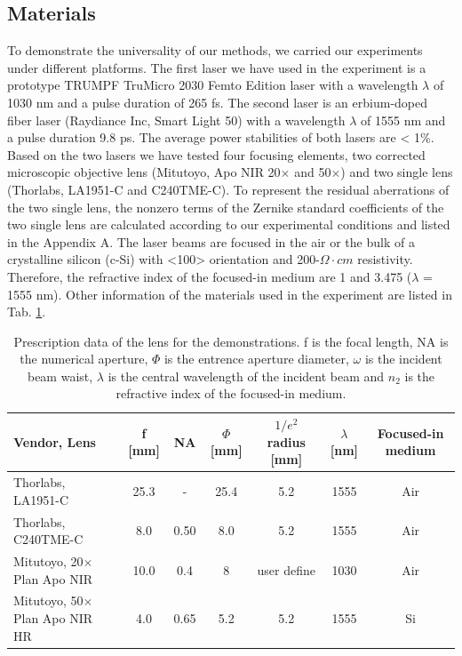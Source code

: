 \documentclass[9pt,twocolumn,twoside]{osajnl}
\begin{document}
\subsection{Materials}
To demonstrate the universality of our methods, we carried our experiments under different platforms. The first laser we have used in the experiment is a prototype TRUMPF TruMicro 2030 Femto Edition laser with a wavelength $\lambda$ of 1030 nm and a pulse duration of 265 fs. The second laser is an erbium-doped fiber laser (Raydiance Inc, Smart Light 50) with a wavelength $\lambda$ of 1555 nm and a pulse duration 9.8 ps. The average power stabilities of both lasers are < 1\%. Based on the two lasers we have tested four focusing elements, two corrected microscopic objective lens (Mitutoyo, Apo NIR 20$\times$ and 50$\times$) and two single lens (Thorlabs, LA1951-C and C240TME-C). To represent the residual aberrations of the two single lens, the nonzero terms of the Zernike standard coefficients of the two single lens are calculated according to our experimental conditions and listed in the Appendix A. The laser beams are focused in the air or the bulk of a crystalline silicon (c-Si) with <100> orientation and 200-$\Omega\cdot cm$ resistivity. Therefore, the refractive index of the focused-in medium are 1 and 3.475 ($\lambda$ = 1555 nm). Other information of the materials used in the experiment are listed in Tab. \ref{tab:1}.
\begin{table}
	\centering
	\begin{tabular}[c]{|l|c|c|c|c|c|c|}
		\hline
		\rowcolor{gray}
		Vendor, Lens& f [mm]& NA & $\Phi$ [mm] & $1/e^2$ radius [mm] & $\lambda$ [nm]& Focused-in medium\\
		\hline
		Thorlabs, LA1951-C & 25.3 & - & 25.4 & 5.2 & 1555 & Air \\
		\rowcolor{lightgray}
		Thorlabs, C240TME-C & 8.0 & 0.50 & 8.0 & 5.2 & 1555 & Air\\
		Mitutoyo, 20$\times$ Plan Apo NIR & 10.0 & 0.4 & 8 & user define & 1030 & Air\\
		\rowcolor{lightgray}
		Mitutoyo, 50$\times$ Plan Apo NIR HR & 4.0 & 0.65 & 5.2 & 5.2 & 1555 & Si\\
		\hline
	\end{tabular}	
	\caption{Prescription data of the lens for the demonstrations. f is the focal length, NA is the numerical aperture, $\Phi$ is the entrence aperture diameter, $\omega$ is the incident beam waist, $\lambda$ is the central wavelength of the incident beam and $n_2$ is the refractive index of the focused-in medium.}\label{tab:1}
\end{table}
\end{document}
